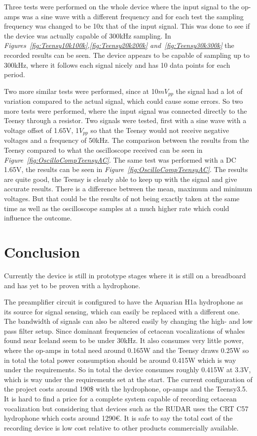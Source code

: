 Three tests were performed on the whole device where the input signal to the op-amps was a sine wave with a different frequency and for each test the sampling frequency was changed to be 10x that of the input signal.
This was done to see if the device was actually capable of 300kHz sampling.
In \textit{Figures~\ref{fig:Teensy10k100k},\ref{fig:Teensy20k200k} and~\ref{fig:Teensy30k300k}} the recorded results can be seen.
The device appears to be capable of sampling up to 300kHz, where it follows each signal nicely and has 10 data points for each period.

Two more similar tests were performed, since at 10$mV_{pp}$ the signal had a lot of variation compared to the actual signal, which could cause some errors.
So two more tests were performed, where the input signal was connected directly to the Teensy through a resistor.
Two signals were tested, first with a sine wave with a voltage offset of 1.65V, 1$V_{pp}$ so that the Teensy would not receive negative voltages and a frequency of 50kHz.
The comparison between the results from the Teensy compared to what the oscilloscope received can be seen in \textit{Figure~\ref{fig:OscilloCompTeensyAC}}.
The same test was performed with a DC 1.65V, the results can be seen in \textit{Figure~\ref{fig:OscilloCompTeensyAC}}. 
The results are quite good, the Teensy is clearly able to keep up with the signal and give accurate results.
There is a difference between the mean, maximum and minimum voltages. 
But that could be the results of not being exactly taken at the same time as well as the oscilloscope samples at a much higher rate which could influence the outcome.


\clearpage


\section{Conclusion}\label{sec:conclusions}

Currently the device is still in prototype stages where it is still on a breadboard and has yet to be proven with a hydrophone.

The preamplifier circuit is configured to have the Aquarian H1a hydrophone as its source for signal sensing, which can easily be replaced with a different one.
The bandwidth of signals can also be altered easily by changing the high- and low pass filter setup.
Since dominant frequencies of cetacean vocalizations of whales found near Iceland seem to be under 30kHz.
It also consumes very little power, where the op-amps in total need around 0.165W and the Teensy draws 0.25W so in total the total power consumption should be around 0.415W which is way under the requirements.
So in total the device consumes roughly 0.415W at 3.3V, which is way under the requirements set at the start.
The current configuration of the project costs around 190\$ with the hydrophone, op-amps and the Teensy3.5.
It is hard to find a price for a complete system capable of recording cetacean vocalization but considering that devices such as the RUDAR uses the CRT C57 hydrophone which costs around 1290€.
It is safe to say the total cost of the recording device is low cost relative to other products commercially available.

